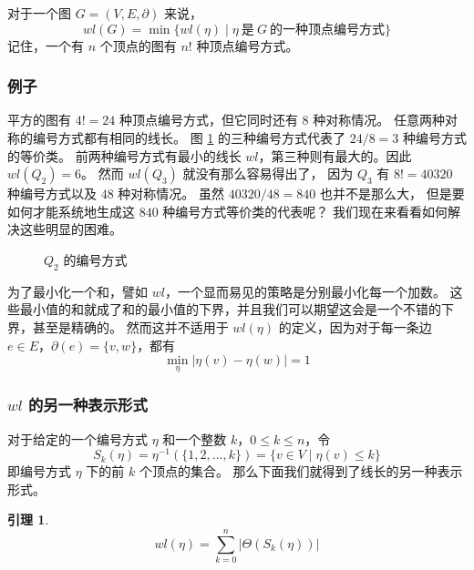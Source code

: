 \documentclass[12pt, a4paper]{article}
\newtheorem{lemma}{引理}
\begin{document}
对于一个图 $G = (V, E, \partial)$ 来说，
\begin{equation*}
wl(G) = \min \{wl(\eta) \mid \eta\ \text{是}\ G\ \text{的一种顶点编号方式}\}
\end{equation*}
记住，一个有 $n$ 个顶点的图有 $n!$ 种顶点编号方式。

\subsubsection{例子}
\label{Subsubsection 3.1.1}

平方的图有 $4! = 24$ 种顶点编号方式，但它同时还有 $8$ 种对称情况。
任意两种对称的编号方式都有相同的线长。
图 \ref{Figure 3} 的三种编号方式代表了 $24 / 8 = 3$ 种编号方式的等价类。
前两种编号方式有最小的线长 $wl$，第三种则有最大的。因此 $wl(Q_2) = 6$。
然而 $wl(Q_3)$ 就没有那么容易得出了，
因为 $Q_3$ 有 $8! = 40320$ 种编号方式以及 $48$ 种对称情况。
虽然 $40320 / 48 = 840$ 也并不是那么大，
但是要如何才能系统地生成这 $840$ 种编号方式等价类的代表呢？
我们现在来看看如何解决这些明显的困难。

\begin{figure}
	\centering
	
	\caption{$Q_2$ 的编号方式}
	\label{Figure 3}
\end{figure}

为了最小化一个和，譬如 $wl$，一个显而易见的策略是分别最小化每一个加数。
这些最小值的和就成了和的最小值的下界，并且我们可以期望这会是一个不错的下界，甚至是精确的。
然而这并不适用于 $wl(\eta)$ 的定义，因为对于每一条边 $e \in E $，$\partial(e) = \{v, w\}$，都有
\begin{equation*}
\min_{\eta} |\eta(v) - \eta(w)| = 1
\end{equation*}

\subsubsection{$wl$ 的另一种表示形式}
\label{Subsubsection 3.1.2}

对于给定的一个编号方式 $\eta$ 和一个整数 $k$，$0 \le k \le n$，令
\begin{equation*}
S_k(\eta) = \eta^{-1}(\{1, 2, \dots, k\}) = \{v \in V \mid \eta(v) \le k\}
\end{equation*}
即编号方式 $\eta$ 下的前 $k$ 个顶点的集合。
那么下面我们就得到了线长的另一种表示形式。

\begin{lemma}
\label{Lemma 4}
\begin{equation*}
wl(\eta) = \sum_{k = 0}^n |\Theta(S_k(\eta))|
\end{equation*}
\end{lemma}
\end{document}

